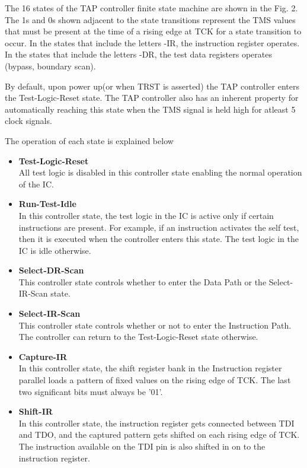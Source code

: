 \documentclass[a4paper,11pt]{article}
\begin{document}
The 16 states of the TAP controller finite state machine are shown in the Fig. 2. The 1s and 0s shown adjacent to the state transitions represent the TMS values that must be present at the time of a rising edge at TCK for a state transition to occur. In the states that include the letters -IR, the instruction register operates. In the states that include the letters -DR, the test data registers operates (bypass, boundary scan).\cite{TAPController}

By default, upon power up(or when TRST is asserted) the TAP controller enters the Test-Logic-Reset state. The TAP controller also has an inherent property for automatically reaching this state when the TMS signal is held high for atleast 5 clock signals.

The operation of each state is explained below\cite{TAPController}
\begin{itemize}[noitemsep]
\item \textbf{Test-Logic-Reset} \\All test logic is disabled in this controller state enabling the normal operation of the IC.
\item \textbf{Run-Test-Idle} \\In this controller state, the test logic in the IC is active only if certain instructions are present. For example, if an instruction activates the self test, then it is executed when the controller enters this state. The test logic in the IC is idle otherwise.
\item \textbf{Select-DR-Scan} \\This controller state controls whether to enter the Data Path or the Select-IR-Scan state.
\item \textbf{Select-IR-Scan} \\This controller state controls whether or not to enter the Instruction Path. The controller can return to the Test-Logic-Reset state otherwise.
\item \textbf{Capture-IR} \\In this controller state, the shift register bank in the Instruction register parallel loads a pattern of fixed values on the rising edge of TCK. The last two significant bits must always be '01'.
\item \textbf{Shift-IR} \\In this controller state, the instruction register gets connected between TDI and TDO, and the captured pattern gets shifted on each rising edge of TCK. The instruction available on the TDI pin is also shifted in on to the instruction register.

\end{itemize}
\end{document}

